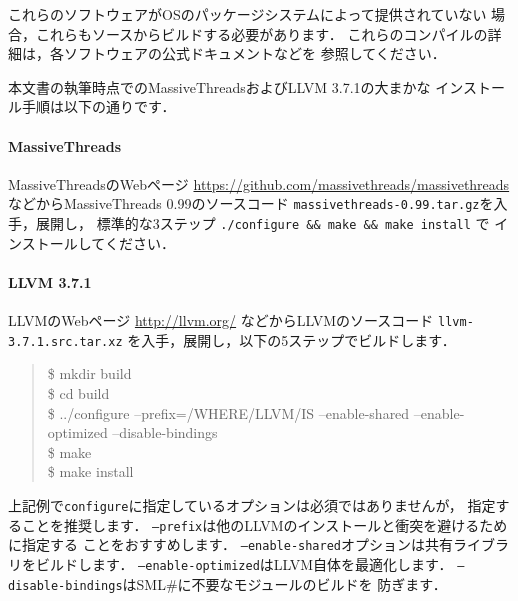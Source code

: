\documentclass{jbook}
\newcommand{\smlsharp}{SML\#}
\newenvironment{program}{\begin{quote}\begin{tt}}%
                        {\end{tt}\end{quote}}
\begin{document}
	これらのソフトウェアがOSのパッケージシステムによって提供されていない
場合，これらもソースからビルドする必要があります．
	これらのコンパイルの詳細は，各ソフトウェアの公式ドキュメントなどを
参照してください．

	本文書の執筆時点でのMassiveThreadsおよびLLVM 3.7.1の大まかな
インストール手順は以下の通りです．

\paragraph{MassiveThreads}
	MassiveThreadsのWebページ
\url{https://github.com/massivethreads/massivethreads}%
などからMassiveThreads 0.99のソースコード
{\tt massivethreads-0.99.tar.gz}を入手，展開し，
標準的な3ステップ {\tt ./configure \&\& make \&\& make install} で
インストールしてください．

\paragraph{LLVM 3.7.1}
	LLVMのWebページ \url{http://llvm.org/} などからLLVMのソースコード
{\tt llvm-3.7.1.src.tar.xz}%
を入手，展開し，以下の5ステップでビルドします．
\begin{program}
\$ mkdir build\\
\$ cd build\\
\$ ../configure --prefix=/WHERE/LLVM/IS --enable-shared --enable-optimized --disable-bindings\\
\$ make\\
\$ make install
\end{program}
	上記例で{\tt configure}に指定しているオプションは必須ではありませんが，
指定することを推奨します．
	{\tt --prefix}は他のLLVMのインストールと衝突を避けるために指定する
ことをおすすめします．
	{\tt --enable-shared}オプションは共有ライブラリをビルドします．
	{\tt --enable-optimized}はLLVM自体を最適化します．
	{\tt --disable-bindings}は\smlsharp{}に不要なモジュールのビルドを
防ぎます．
\end{document}
